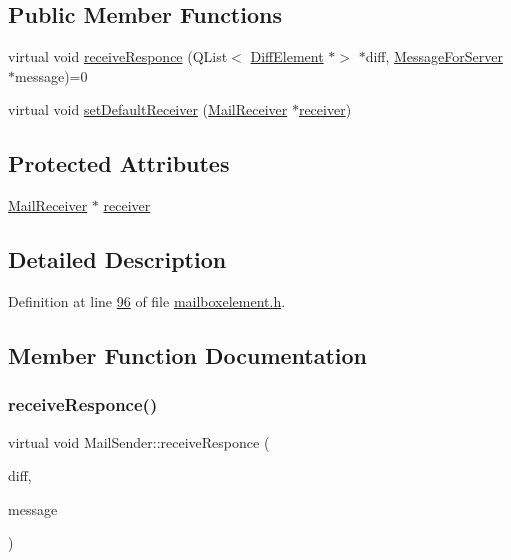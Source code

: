 \subsection*{Public Member Functions}
\begin{DoxyCompactItemize}
\item 
virtual void \hyperlink{a00205_aba34437231a62861737e97d50f85e7e8}{receive\+Responce} (Q\+List$<$ \hyperlink{a00141}{Diff\+Element} $\ast$$>$ $\ast$diff, \hyperlink{a00121}{Message\+For\+Server} $\ast$message)=0
\item 
virtual void \hyperlink{a00205_aa85db0004c26606c5ac294e5de000b96}{set\+Default\+Receiver} (\hyperlink{a00197}{Mail\+Receiver} $\ast$\hyperlink{a00205_aa57ce2f74f8ad76abb38974f85b97ac5}{receiver})
\end{DoxyCompactItemize}
\subsection*{Protected Attributes}
\begin{DoxyCompactItemize}
\item 
\hyperlink{a00197}{Mail\+Receiver} $\ast$ \hyperlink{a00205_aa57ce2f74f8ad76abb38974f85b97ac5}{receiver}
\end{DoxyCompactItemize}


\subsection{Detailed Description}


Definition at line \hyperlink{a00002_source_l00096}{96} of file \hyperlink{a00002_source}{mailboxelement.\+h}.



\subsection{Member Function Documentation}
\mbox{\label{a00205_aba34437231a62861737e97d50f85e7e8}} 
\subsubsection{\texorpdfstring{receive\+Responce()}{receiveResponce()}}
{\footnotesize\ttfamily virtual void Mail\+Sender\+::receive\+Responce (\begin{DoxyParamCaption}\item[{Q\+List$<$ \hyperlink{a00141}{Diff\+Element} $\ast$$>$ $\ast$}]{diff,  }\item[{\hyperlink{a00121}{Message\+For\+Server} $\ast$}]{message }\end{DoxyParamCaption})\hspace{0.3cm}{\ttfamily [pure virtual]}}



